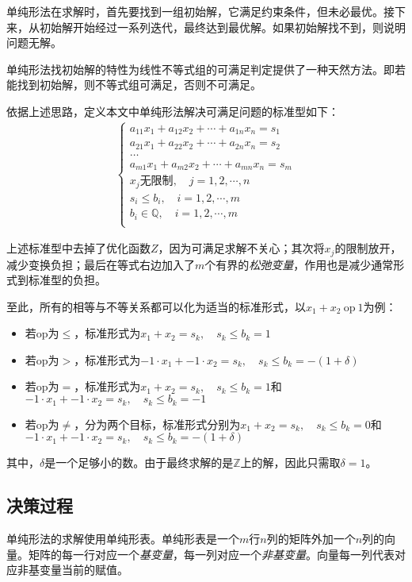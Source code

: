 单纯形法在求解时，首先要找到一组初始解，它满足约束条件，但未必最优。接下来，从初始解开始经过一系列迭代，最终达到最优解。如果初始解找不到，则说明问题无解。

单纯形法找初始解的特性为线性不等式组的可满足判定提供了一种天然方法。即若能找到初始解，则不等式组可满足，否则不可满足。

依据上述思路，定义本文中单纯形法解决可满足问题的标准型如下：
\begin{eqnarray*}
  \begin{cases}
    a_{11}x_1 + a_{12}x_2 + \cdots + a_{1n}x_n = s_1 \\
    a_{21}x_1 + a_{22}x_2 + \cdots + a_{2n}x_n = s_2 \\
    \dots \\
    a_{m1}x_1 + a_{m2}x_2 + \cdots + a_{mn}x_n = s_m \\
    x_j \textrm{无限制}, \quad j = 1, 2, \cdots, n \\
    s_i \leq b_i, \quad i = 1, 2, \cdots, m \\
    b_i \in \mathbb{Q}, \quad i = 1, 2, \cdots, m \\
  \end{cases}
\end{eqnarray*}

上述标准型中去掉了优化函数$Z$，因为可满足求解不关心；其次将$x_j$的限制放开，减少变换负担；最后在等式右边加入了$m$个有界的\emph{松弛变量}，作用也是减少通常形式到标准型的负担。

至此，所有的相等与不等关系都可以化为适当的标准形式，以$x_1+x_2 \  \mathrm{op} \  1$为例：
\begin{itemize}
  \item 若op为$\leq$，标准形式为$x_1+x_2 = s_k, \quad s_k \leq b_k = 1$
  \item 若op为$>$，标准形式为$-1 \cdot x_1 + -1 \cdot x_2 = s_k, \quad s_k \leq b_k = -(1+\delta)$
  \item 若op为$=$，标准形式为$x_1+x_2 = s_k, \quad s_k \leq b_k = 1$和$-1 \cdot x_1 + -1 \cdot x_2 = s_k, \quad s_k \leq b_k = -1$
  \item 若op为$\neq$，分为两个目标，标准形式分别为$x_1+x_2 = s_k, \quad s_k \leq b_k = 0$和$-1 \cdot x_1 + -1 \cdot x_2 = s_k, \quad s_k \leq b_k = -(1+\delta)$
\end{itemize}
其中，$\delta$是一个足够小的数。由于最终求解的是$\mathbb{Z}$上的解，因此只需取$\delta=1$。

\subsection{决策过程}
单纯形法的求解使用单纯形表。单纯形表是一个$m$行$n$列的矩阵外加一个$n$列的向量。矩阵的每一行对应一个\emph{基变量}，每一列对应一个\emph{非基变量}。向量每一列代表对应非基变量当前的赋值。

